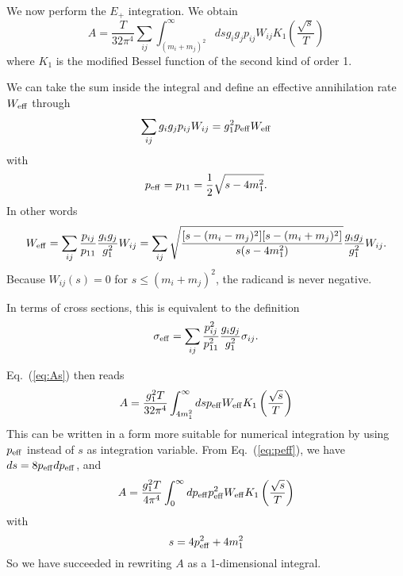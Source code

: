 We now perform the $E_{+}$ integration. We obtain
\begin{equation}
\label{eq:As}
  A = \frac{T}{32 \pi^4} \sum_{ij} \int_{(m_i+m_j)^2}^\infty ds
  g_ig_jp_{ij} W_{ij} K_{1} \left( \frac{\sqrt{s}}{T}\right)
\end{equation}
where $K_{1}$ is the modified Bessel function of the second kind of 
order 1.

We can take the sum inside the integral and define an effective
annihilation rate $W_{\rm eff}$ through
\begin{equation}
  \sum_{ij} g_i g_j p_{ij} W_{ij} = g_1^2 p_{\rm{eff}} W_{\rm{eff}}
\end{equation}
with
\begin{equation}
\label{eq:peff}
  p_{\rm{eff}} = p_{11} = \frac{1}{2} \sqrt{s-4m_{1}^2} .
\end{equation}
In other words
\begin{equation} \label{eq:weff}
  W_{\rm{eff}} = \sum_{ij}\frac{p_{ij}}{p_{11}}
  \frac{g_ig_j}{g_1^2} W_{ij} = 
  \sum_{ij} \sqrt{\frac{[s-(m_{i}-m_{j})^2][s-(m_{i}+m_{j})^2]}
  {s(s-4m_1^2)}} \frac{g_ig_j}{g_1^2} W_{ij}.
\end{equation}
Because $W_{ij}(s) = 0 $ for $s \le (m_i+m_j)^2$, the radicand is  
never negative.

In terms of cross sections, this is equivalent to the definition
\begin{equation}
\sigma_{\rm eff} = \sum_{ij} \frac{p^2_{ij}}{p^2_{11}}
  \frac{g_ig_j}{g_1^2} \sigma_{ij}.
\end{equation}  

Eq.~(\ref{eq:As}) then reads
\begin{equation}
  A = \frac{g_1^2 T}{32 \pi^4} \int_{4m_1^2}^\infty ds
  p_{\rm eff} W_{\rm eff} K_{1} \left( \frac{\sqrt{s}}{T}\right)
\end{equation}
This can be written in a form more suitable
for numerical integration by using $p_{\rm{eff}}$ instead of $s$ as
integration variable.  From Eq.~(\ref{eq:peff}), we have 
 $ ds = 8 p_{\rm{eff}} dp_{\rm{eff}} $, and 
\begin{equation}
\label{eq:Apeff}
  A = \frac{g_1^2 T}{4 \pi^4} \int_{0}^\infty dp_{\rm eff}
  p^2_{\rm eff} W_{\rm eff} K_{1} 
  \left( \frac{\sqrt{s}}{T}\right)
\end{equation}
with
\begin{equation}
  s = 4p_{\rm{eff}}^2 + 4m_1^2
\end{equation}
So we have succeeded in rewriting $A$ as a 1-dimensional integral.

